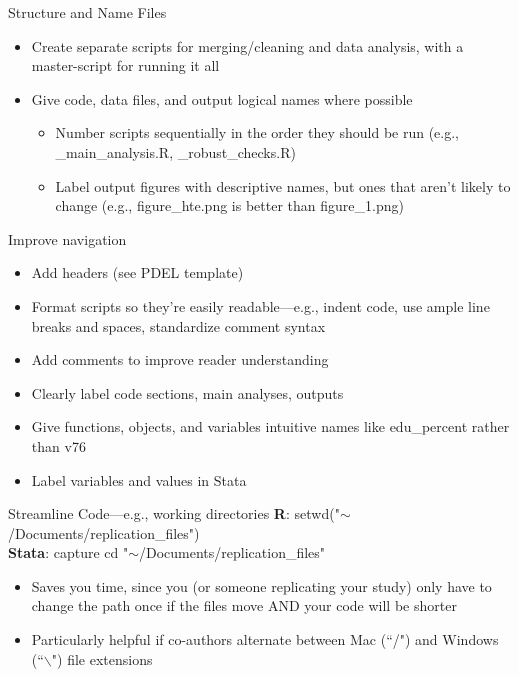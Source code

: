\documentclass[12pt, compress, handout]{beamer}
\renewcommand{\texttt}[2][ceruleanblue]{\textcolor{#1}{\ttfamily #2}}
\let\noteitem\item %
\renewcommand{\item}{ 
	\noteitem\vspace{\fill}
	}
\begin{document}
	\begin{frame}{Structure and Name Files}
 		
 		\begin{itemize}
 			\item	 Create separate scripts for merging/cleaning and data analysis, with a master-script for running it all
 			\item Give code, data files, and output logical names where possible 
 			\begin{itemize}
 				\item Number scripts sequentially in the order they should be run (e.g., \texttt{1\_main\_analysis.R}, \texttt{2\_robust\_checks.R})
 				\item Label output figures with descriptive names, but ones that aren't likely to change (e.g., \texttt{figure\_hte.png} is better than \texttt{figure\_1.png})
 			\end{itemize}
 		\end{itemize}
 	\end{frame}
 
	 \begin{frame}{Improve navigation}
	 	
	 	\begin{itemize}
	 		\item Add headers (see PDEL template)
	 		\item Format scripts so they're easily readable---e.g., indent code, use ample line breaks and spaces, standardize comment syntax
	 		\item Add comments to improve reader understanding
			\item Clearly label code sections, main analyses, outputs 
			\item Give functions, objects, and variables intuitive names like \texttt{edu\_percent} rather than \texttt{v76}
			\item Label variables and values in Stata
			\end{itemize}
	 \end{frame}
	 	 
	 \begin{frame}{Streamline Code—e.g., working directories}  
			\textbf{R}: \texttt{setwd("$\sim$/Documents/replication\_files")} \\
		 	\textbf{Stata}: \texttt{capture cd "$\sim$/Documents/replication\_files"}
		 	
		 	\bigskip
		 	\pause
			 \begin{itemize}
			 	\item Saves you time, since you (or someone replicating your study) only have to change the path once if the files move AND your code will be shorter
			 	\item Particularly helpful if co-authors alternate between Mac (``/") and Windows (``$\backslash$") file extensions
			 \end{itemize}
	 \end{frame}
\end{document}
